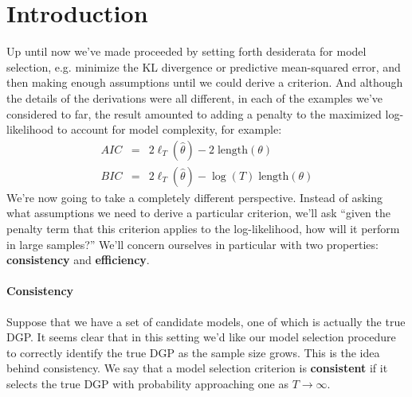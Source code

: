 



\section{Introduction}
Up until now we've made proceeded by setting forth desiderata for model selection, e.g. minimize the KL divergence or predictive mean-squared error, and then making enough assumptions until we could derive a criterion. And although the details of the derivations were all different, in each of the examples we've considered to far, the result amounted to adding a penalty to the maximized log-likelihood to account for model complexity, for example:
	\begin{eqnarray*}
		AIC &=& 2\ell_T(\widehat{\theta}) - 2\; \mbox{length}(\theta)\\
		BIC &=& 2\ell_T(\widehat{\theta}) - \log(T)\; \mbox{length}(\theta)
	\end{eqnarray*}
We're now going to take a completely different perspective. Instead of asking what assumptions we need to derive a particular criterion, we'll ask ``given the penalty term that this criterion applies to the log-likelihood, how will it perform in large samples?'' We'll concern ourselves in particular with two properties: \textbf{consistency} and \textbf{efficiency}. 

\paragraph{Consistency} Suppose that we have a set of candidate models, one of which is actually the true DGP. It seems clear that in this setting we'd like our model selection procedure to correctly identify the true DGP as the sample size grows. This is the idea behind consistency. We say that a model selection criterion is \textbf{consistent} if it selects the true DGP with probability approaching one as $T\rightarrow \infty$. 

